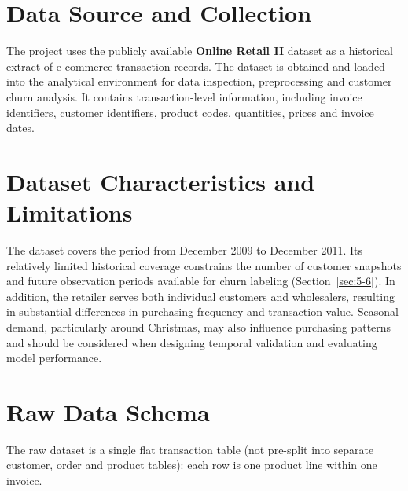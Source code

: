 \section{Data Source and Collection}
\label{sec:3-1}

The project uses the publicly available \textbf{Online Retail II} dataset as a historical extract of e-commerce transaction records. The dataset is obtained and loaded into the analytical environment for data inspection, preprocessing and customer churn analysis. It contains transaction-level information, including invoice identifiers, customer identifiers, product codes, quantities, prices and invoice dates.

\section{Dataset Characteristics and Limitations}
\label{sec:3-2}

The dataset covers the period from December 2009 to December 2011. Its relatively limited historical coverage constrains the number of customer snapshots and future observation periods available for churn labeling (Section~\ref{sec:5-6}). In addition, the retailer serves both individual customers and wholesalers, resulting in substantial differences in purchasing frequency and transaction value. Seasonal demand, particularly around Christmas, may also influence purchasing patterns and should be considered when designing temporal validation and evaluating model performance.

\section{Raw Data Schema}
\label{sec:3-3}

The raw dataset is a single flat transaction table (not pre-split into separate customer, order and product tables): each row is one product line within one invoice.


